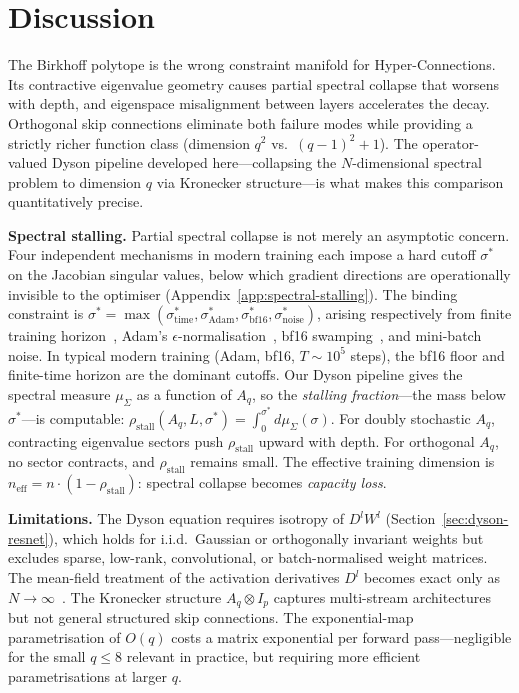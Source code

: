 
\section{Discussion}\label{sec:discussion}

The Birkhoff polytope is the wrong constraint manifold for Hyper-Connections. Its contractive eigenvalue geometry causes partial spectral collapse that worsens with depth, and eigenspace misalignment between layers accelerates the decay. Orthogonal skip connections eliminate both failure modes while providing a strictly richer function class (dimension $q^2$ vs.\ $(q-1)^2 + 1$). The operator-valued Dyson pipeline developed here---collapsing the $N$-dimensional spectral problem to dimension $q$ via Kronecker structure---is what makes this comparison quantitatively precise.

\medskip
\noindent\textbf{Spectral stalling.}
Partial spectral collapse is not merely an asymptotic concern. Four independent mechanisms in modern training each impose a hard cutoff $\sigma^*$ on the Jacobian singular values, below which gradient directions are operationally invisible to the optimiser (Appendix~\ref{app:spectral-stalling}). The binding constraint is $\sigma^* = \max(\sigma^*_{\mathrm{time}}, \sigma^*_{\mathrm{Adam}}, \sigma^*_{\mathrm{bf16}}, \sigma^*_{\mathrm{noise}})$, arising respectively from finite training horizon~\cite{saxe2014exact}, Adam's $\epsilon$-normalisation~\cite{kingma2015adam}, bf16 swamping~\cite{micikevicius2018mixed}, and mini-batch noise. In typical modern training (Adam, bf16, $T \sim 10^5$ steps), the bf16 floor and finite-time horizon are the dominant cutoffs. Our Dyson pipeline gives the spectral measure $\mu_\Sigma$ as a function of $A_q$, so the \emph{stalling fraction}---the mass below $\sigma^*$---is computable: $\rho_{\mathrm{stall}}(A_q, L, \sigma^*) = \int_0^{\sigma^*} d\mu_\Sigma(\sigma)$. For doubly stochastic $A_q$, contracting eigenvalue sectors push $\rho_{\mathrm{stall}}$ upward with depth. For orthogonal $A_q$, no sector contracts, and $\rho_{\mathrm{stall}}$ remains small. The effective training dimension is $n_{\mathrm{eff}} = n \cdot (1 - \rho_{\mathrm{stall}})$: spectral collapse becomes \emph{capacity loss}.

\medskip
\noindent\textbf{Limitations.}
The Dyson equation requires isotropy of $D^l W^l$ (Section~\ref{sec:dyson-resnet}), which holds for i.i.d.\ Gaussian or orthogonally invariant weights but excludes sparse, low-rank, convolutional, or batch-normalised weight matrices. The mean-field treatment of the activation derivatives $D^l$ becomes exact only as $N \to \infty$~\cite{pennington2017resurrecting}. The Kronecker structure $A_q \otimes I_p$ captures multi-stream architectures but not general structured skip connections. The exponential-map parametrisation of $O(q)$ costs a matrix exponential per forward pass---negligible for the small $q \leq 8$ relevant in practice, but requiring more efficient parametrisations at larger $q$.


